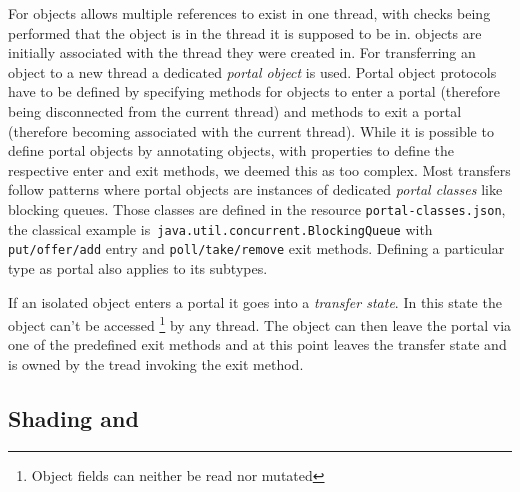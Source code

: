 For \Isolated objects \jdala allows multiple references to exist in one thread, with checks being performed that the object is in the thread it is supposed to be in. \Isolated objects are initially associated with the thread they were created in. For transferring an \Isolated object to a new thread a dedicated \textit{portal object} is used. Portal object protocols have to be defined by specifying methods for objects to enter a portal (therefore being disconnected from the current thread) and methods to exit a portal (therefore becoming associated with the current thread).  While it is possible to define portal objects by annotating objects, with properties to define the respective enter and exit methods, we deemed this  as too complex. Most transfers follow patterns where portal objects are instances of dedicated \textit{portal classes} like blocking queues.  
Those classes are defined in the resource \texttt{portal-classes.json}, the classical example is\texttt{ java.util.concurrent.BlockingQueue} with \texttt{put/\-offer/\-add} entry  and \texttt{poll/\-take/\-remove} exit methods. Defining a particular type as portal also applies to its subtypes. 


If an isolated object enters a portal it goes into a \textit{transfer state}. In this state the object can't be accessed \footnote{Object fields can neither be read nor mutated} by any thread. The object can then leave the portal via one of the predefined exit methods and at this point leaves the transfer state and is owned by the tread invoking the exit method.


\subsection{Shading and }


